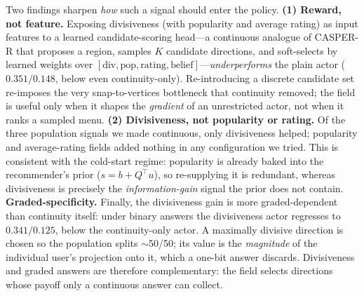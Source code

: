 \documentclass[11pt]{article}
\begin{document}
Two findings sharpen \emph{how} such a signal should enter the policy. \textbf{(1) Reward, not feature.} Exposing
divisiveness (with popularity and average rating) as input features to a learned candidate-scoring head---a continuous
analogue of CASPER-R that proposes a region, samples $K$ candidate directions, and soft-selects by learned weights over
$[\text{div},\text{pop},\text{rating},\text{belief}]$---\emph{underperforms} the plain actor ($0.351/0.148$, below even
continuity-only). Re-introducing a discrete candidate set re-imposes the very snap-to-vertices bottleneck that continuity
removed; the field is useful only when it shapes the \emph{gradient} of an unrestricted actor, not when it ranks a
sampled menu. \textbf{(2) Divisiveness, not popularity or rating.} Of the three population signals we made continuous,
only divisiveness helped; popularity and average-rating fields added nothing in any configuration we tried. This is
consistent with the cold-start regime: popularity is already baked into the recommender's prior ($s=b+Q^\top u$), so
re-supplying it is redundant, whereas divisiveness is precisely the \emph{information-gain} signal the prior does not
contain. \textbf{Graded-specificity.} Finally, the divisiveness gain is more graded-dependent than continuity itself:
under binary answers the divisiveness actor regresses to $0.341/0.125$, below the continuity-only actor. A maximally
divisive direction is chosen so the population splits $\sim$50/50; its value is the \emph{magnitude} of the individual
user's projection onto it, which a one-bit answer discards. Divisiveness and graded answers are therefore complementary:
the field selects directions whose payoff only a continuous answer can collect.
\end{document}
